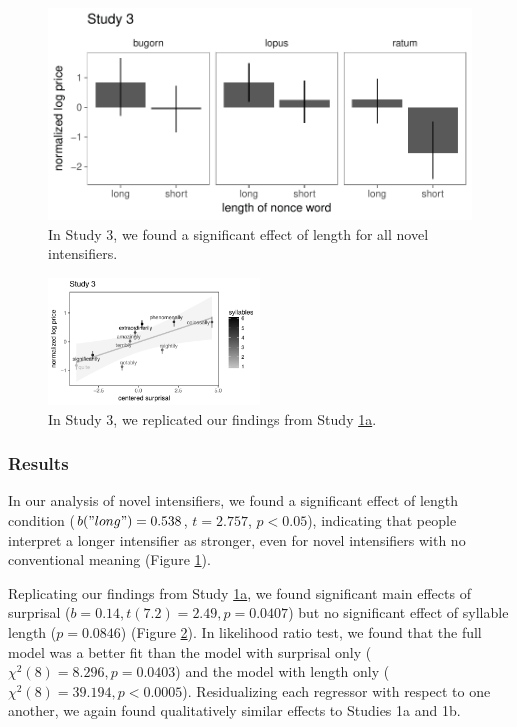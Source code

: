 \documentclass[10pt,letterpaper]{article}
\begin{document}
\begin{figure}[hbt]
\begin{center}
\includegraphics[width=.5\textwidth]{images/plot_study3_A.pdf}
\end{center}
\caption{In Study 3, we found a significant effect of length for all novel intensifiers.} 
\label{fig:plot_study3_barplot}
\end{figure}

\begin{figure}[hbt]
\begin{center}
\includegraphics[width=0.5\textwidth]{images/plot_study3_B.pdf}
\end{center}
\caption{In Study 3, we replicated our findings from Study \hyperref[sec:study1a]{1a}.}
\label{fig:plot_study3_scatter}
\end{figure}

\subsubsection{Results}

In our analysis of novel intensifiers, we found a significant effect of length condition ($b("long")=0.538$, $t=2.757$, $p<0.05$), indicating that people interpret a longer intensifier as stronger, even for novel intensifiers with no conventional meaning (Figure \ref{fig:plot_study3_barplot}).

Replicating our findings from Study \hyperref[sec:study1a]{1a}, we found significant main effects of surprisal ($b=0.14,t(7.2)=2.49,p=0.0407$) but no significant effect of syllable length ($p=0.0846$) (Figure \ref{fig:plot_study3_scatter}). In likelihood ratio test, we found that the full model was a better fit than the model with surprisal only ($\chi^2(8)=8.296,p=0.0403$) and the model with length only ($\chi^2(8)=39.194,p<0.0005$). Residualizing each regressor with respect to one another, we again found qualitatively similar effects to Studies 1a and 1b.
\end{document}
